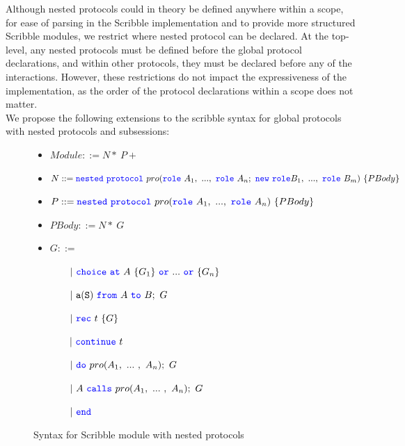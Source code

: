 \documentclass[12pt,twoside]{report}
\begin{document}
Although nested protocols could in theory be defined anywhere within a scope, for ease of parsing in the Scribble implementation and to provide more structured Scribble modules, we restrict where nested protocol can be declared. At the top-level, any nested protocols must be defined before the global protocol declarations, and within other protocols, they must be declared before any of the interactions. However, these restrictions do not impact the expressiveness of the implementation, as the order of the protocol declarations within a scope does not matter.\\

We propose the following extensions to the scribble syntax for global protocols with nested protocols and subsessions:
\begin{figure}[!h]
    \begin{itemize}
        \item $Module ::= N\!*\ P+$
        \item $N ::=\nested\ \protocol\ pro(\role\ A_1,\ ...,\ \role\ A_n;\ \scrnew\ \role B_1,\ ...,\ \role\ B_m)\ \{PBody\}$
        \item  $P ::=\nested\ \protocol\ pro(\role\ A_1,\ ...,\ \role\ A_n)\ \{PBody\}$
        \item $PBody ::=  N\!*\ G$
        \item $G ::= $
        
        $\quad\quad|\ \choice\ \at\ A\ \{G_1\}\ \scror\ ...\ \scror\ \{G_n\}$
    
        $\quad\quad|\ \scrmessage{a}{S}\ \from\ A\ \scrto\ B;\ G$
        
        $\quad\quad|\ {\color{blue}\mathtt{rec}}\ t\ \{G\}$
        
        $\quad\quad|\ {\color{blue}\mathtt{continue}}\ t$
        
        $\quad\quad|\ \scrdo\ pro(A_1,\ ...\ ,\ A_n);\ G$
    
        $\quad\quad|\ A\ \calls\ pro(A_1,\ ...\ ,\ A_n);\ G$
        
        $\quad\quad|\ {\color{blue}\mathtt{end}}$
    
    \end{itemize}
    \caption{Syntax for Scribble module with nested protocols}
    \label{scribble-nested-syntax-global}
\end{figure}
\end{document}
